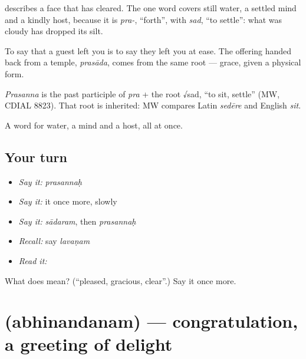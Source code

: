 \textbf{} describes a face that has cleared. The one word covers still water, a settled mind and a kindly host, because it is \emph{pra-}, \textquotedblleft{}forth\textquotedblright{}, with \emph{sad}, \textquotedblleft{}to settle\textquotedblright{}: what was cloudy has dropped its silt.

To say that a guest left you \textbf{} is to say they left you at ease. The offering handed back from a temple, \emph{prasāda}, comes from the same root — grace, given a physical form.

\begin{cousinweb}
\emph{Prasanna} is the past participle of \emph{pra} + the root √sad, \textquotedblleft{}to sit, settle\textquotedblright{} (MW, CDIAL 8823). That root is inherited: MW compares Latin \emph{sedēre} and English \emph{sit}.
\end{cousinweb}

\begin{grammarlens}[title={What you've built}]
A word for water, a mind and a host, all at once.
\end{grammarlens}

\subsection*{Your turn}
\begin{itemize}
\raggedright
  \item \emph{Say it:} \emph{prasannaḥ}
  \item \emph{Say it:} it once more, slowly
  \item \emph{Say it:} \emph{sādaram}, then \emph{prasannaḥ}
  \item \emph{Recall:} say \emph{lavaṇam}
  \item \emph{Read it:} \textbf{}
\end{itemize}

\begin{tcolorbox}[breakable,colback=teal!4,colframe=teal!35!black,title={Before you move on}]
What does  mean? (\textquotedblleft{}pleased, gracious, clear\textquotedblright{}.) Say it once more.
\end{tcolorbox}
\section[\texorpdfstring{\sk{अभिनन्दनम्} (abhinandanam)}{अभिनन्दनम् (abhinandanam)}]{ (abhinandanam) — congratulation, a greeting of delight}

